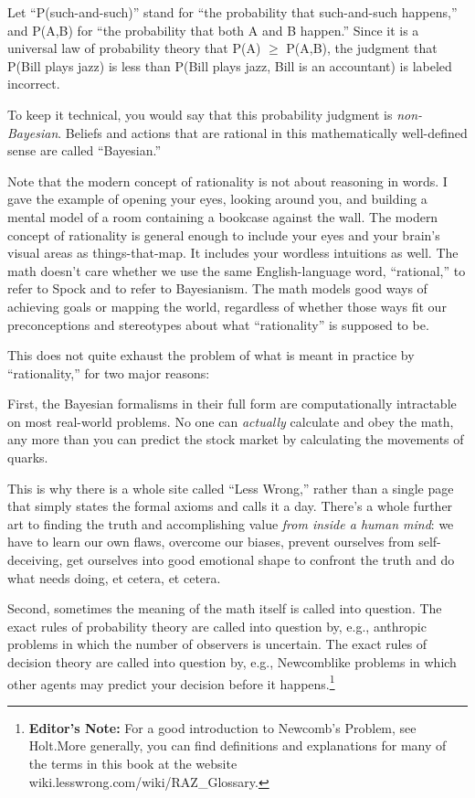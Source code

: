 {
 Let ``P(such-and-such)'' stand
for ``the probability that such-and-such
happens,'' and P(A,B) for ``the
probability that both A and B happen.'' Since it is a
universal law of probability theory that P(A) ${\geq}$ P(A,B), the
judgment that P(Bill plays jazz) is less than P(Bill plays jazz, Bill
is an accountant) is labeled incorrect.}

{
 To keep it technical, you would say that this probability judgment
is \textit{non-Bayesian}. Beliefs and actions that are rational in this
mathematically well-defined sense are called
``Bayesian.''}

{
 Note that the modern concept of rationality is not about reasoning
in words. I gave the example of opening your eyes, looking around you,
and building a mental model of a room containing a bookcase against the
wall. The modern concept of rationality is general enough to include
your eyes and your brain's visual areas as
things-that-map. It includes your wordless intuitions as well. The math
doesn't care whether we use the same English-language
word, ``rational,'' to refer to
Spock and to refer to Bayesianism. The math models good ways of
achieving goals or mapping the world, regardless of whether those ways
fit our preconceptions and stereotypes about what
``rationality'' is supposed to be.}

{
 This does not quite exhaust the problem of what is meant in
practice by ``rationality,'' for two
major reasons:}

{
 First, the Bayesian formalisms in their full form are
computationally intractable on most real-world problems. No one can
\textit{actually} calculate and obey the math, any more than you can
predict the stock market by calculating the movements of quarks.}

{
 This is why there is a whole site called ``Less
Wrong,'' rather than a single page that simply states
the formal axioms and calls it a day. There's a whole
further art to finding the truth and accomplishing value \textit{from
inside a human mind}: we have to learn our own flaws, overcome our
biases, prevent ourselves from self-deceiving, get ourselves into good
emotional shape to confront the truth and do what needs doing, et
cetera, et cetera.}

{
 Second, sometimes the meaning of the math itself is called into
question. The exact rules of probability theory are called into
question by, e.g., anthropic problems in which the number of observers
is uncertain. The exact rules of decision theory are called into
question by, e.g., Newcomblike problems in which other agents may
predict your decision before it happens.\footnote{\textbf{Editor's Note:} For a good introduction
to Newcomb's Problem, see Holt.\footnotemark More
generally, you can find definitions and explanations for many of the
terms in this book at the website
wiki.lesswrong.com/wiki/RAZ\_Glossary.}}

